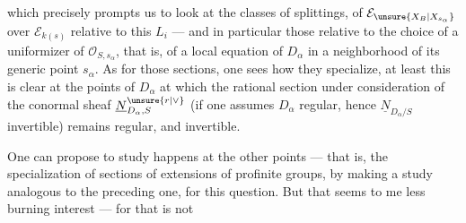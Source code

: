 which precisely prompts us to look at the classes of splittings, of $\mathcal E_{\unsure{X_B|X_{s_\alpha}}}$ over $\mathcal E_{k(s)}$ relative to this $L_i$ --- and in particular those relative to the choice of a uniformizer of $\mathcal O_{S,s_\alpha}$, that is, of a local equation of $D_\alpha$ in a neighborhood of its generic point $s_\alpha$.   As for those sections, one sees how they specialize, at least this is clear at the points of $D_\alpha$ at which the rational section under consideration of the conormal sheaf $\underline N_{D_\alpha,S}^{\unsure{r|\vee}}$ (if one assumes $D_\alpha$ regular,  hence $\underline N_{D_\alpha/S}$ invertible) remains regular, and invertible.

One can propose to study   happens at the other points --- that is, the specialization of sections  of extensions of profinite groups, by making a study analogous to the preceding one, for this question. But that seems to me   less burning interest --- for that is not
